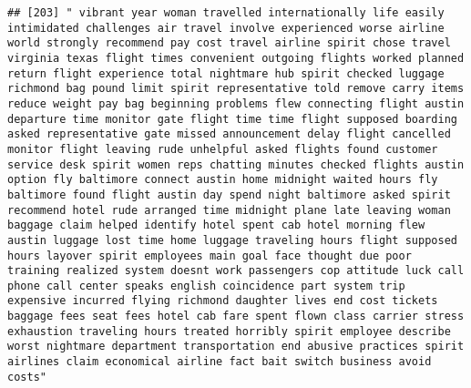 \documentclass[
]{article}
\begin{document}
\begin{verbatim}
## [203] " vibrant year woman travelled internationally life easily intimidated challenges air travel involve experienced worse airline world strongly recommend pay cost travel airline spirit chose travel virginia texas flight times convenient outgoing flights worked planned return flight experience total nightmare hub spirit checked luggage richmond bag pound limit spirit representative told remove carry items reduce weight pay bag beginning problems flew connecting flight austin departure time monitor gate flight time time flight supposed boarding asked representative gate missed announcement delay flight cancelled monitor flight leaving rude unhelpful asked flights found customer service desk spirit women reps chatting minutes checked flights austin option fly baltimore connect austin home midnight waited hours fly baltimore found flight austin day spend night baltimore asked spirit recommend hotel rude arranged time midnight plane late leaving woman baggage claim helped identify hotel spent cab hotel morning flew austin luggage lost time home luggage traveling hours flight supposed hours layover spirit employees main goal face thought due poor training realized system doesnt work passengers cop attitude luck call phone call center speaks english coincidence part system trip expensive incurred flying richmond daughter lives end cost tickets baggage fees seat fees hotel cab fare spent flown class carrier stress exhaustion traveling hours treated horribly spirit employee describe worst nightmare department transportation end abusive practices spirit airlines claim economical airline fact bait switch business avoid costs"                                                                                        

\end{verbatim}
\end{document}
